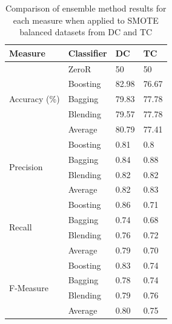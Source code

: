 \begin{table}[h]
\centering
\caption{Comparison of ensemble method results for each measure when applied to SMOTE balanced datasets from DC and TC}
\label{tbl: smote-compare-dc-tc}
\begin{tabular}{@{}llll@{}}
\toprule
Measure                    & Classifier & DC & TC \\ \midrule
\multirow{5}{*}{Accuracy (\%)}  & ZeroR      & 50                  & 50                    \\
                           & Boosting   & 82.98               & 76.67                 \\
                           & Bagging    & 79.83               & 77.78                 \\
                           & Blending   & 79.57               & 77.78                 \\
                           & Average    & 80.79               & 77.41                 \\ \midrule
\multirow{4}{*}{Precision} & Boosting   & 0.81                & 0.8                   \\
                           & Bagging    & 0.84                & 0.88                  \\
                           & Blending   & 0.82                & 0.82                  \\
                           & Average    & 0.82                & 0.83                  \\ \midrule
\multirow{4}{*}{Recall}    & Boosting   & 0.86                & 0.71                  \\
                           & Bagging    & 0.74                & 0.68                  \\
                           & Blending   & 0.76                & 0.72                  \\
                           & Average    & 0.79                & 0.70                  \\ \midrule
\multirow{4}{*}{F-Measure} & Boosting   & 0.83                & 0.74                  \\
                           & Bagging    & 0.78                & 0.74                  \\
                           & Blending   & 0.79                & 0.76                  \\
                           & Average    & 0.80                & 0.75                  \\ \midrule

\end{tabular}
\end{table}
